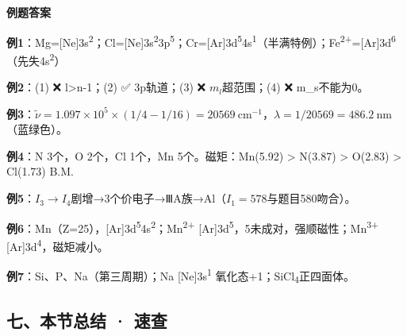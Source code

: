 \documentclass[a4paper,11pt]{ctexart}
\begin{document}
\textbf{例题答案}

\textbf{例1}：Mg={[}Ne{]}3s\textsuperscript{2}；Cl={[}Ne{]}3s\textsuperscript{2}3p\textsuperscript{5}；Cr={[}Ar{]}3d\textsuperscript{5}4s\textsuperscript{1}（半满特例）；Fe\textsuperscript{2+}={[}Ar{]}3d\textsuperscript{6}（先失4s\textsuperscript{2}）

\textbf{例2}：(1) ❌ l\textgreater n-1；(2) ✅ 3p轨道；(3) ❌ \(m_l\)超范围；(4) ❌ m\_s不能为0。

\textbf{例3}：\(\tilde{\nu}=1.097\times10^5\times(1/4-1/16)=20569\ \mathrm{cm^{-1}}\)，\(\lambda=1/20569=486.2\ \mathrm{nm}\)（蓝绿色）。

\textbf{例4}：N 3个，O 2个，Cl 1个，Mn 5个。磁矩：Mn(5.92) \textgreater{} N(3.87) \textgreater{} O(2.83) \textgreater{} Cl(1.73) B.M.

\textbf{例5}：\(I_3\to I_4\)剧增→3个价电子→ⅢA族→Al（\(I_1=578\)与题目580吻合）。

\textbf{例6}：Mn（Z=25），{[}Ar{]}3d\textsuperscript{5}4s\textsuperscript{2}；Mn\textsuperscript{2+} {[}Ar{]}3d\textsuperscript{5}，5未成对，强顺磁性；Mn\textsuperscript{3+} {[}Ar{]}3d\textsuperscript{4}，磁矩减小。

\textbf{例7}：Si、P、Na（第三周期）；Na {[}Ne{]}3s\textsuperscript{1} 氧化态+1；SiCl\textsubscript{4}正四面体。

\subsection{七、本节总结 · 速查}\label{ux4e03ux672cux8282ux603bux7ed3-ux901fux67e5}
\end{document}
